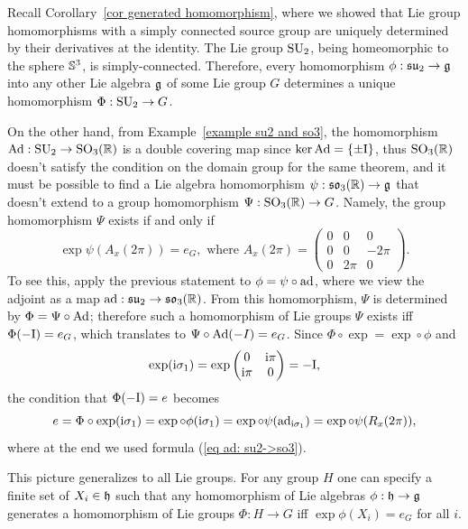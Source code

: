 \begin{example}
    Recall Corollary~\ref{cor generated homomorphism}, where we showed that Lie group homomorphisms with a simply connected source group are uniquely determined by their derivatives at the identity. The Lie group $\operatorname{SU}_2$, being homeomorphic to the sphere $\mathbb{S}^3$, is simply-connected. Therefore, every homomorphism $\phi:\mathfrak{su}_2\to\mathfrak{g}$ into any other Lie algebra $\mathfrak{g}$ of some Lie group $G$ determines a unique homomorphism $\Phi:\operatorname{SU}_2\to G$. 
    
    On the other hand, from Example~\ref{example su2 and so3}, the homomorphism $\mathrm{Ad}:\operatorname{SU}_2\to \operatorname{SO}_3(\mathbb{R})$ is a double covering map since $\ker\mathrm{Ad}=\{\pm \mathrm{I}\}$, thus $\operatorname{SO}_3(\mathbb{R})$ doesn't satisfy the condition on the domain group for the same theorem, and it must be possible to find a Lie algebra homomorphism $\psi:\mathfrak{so}_3(\mathbb{R})\to\mathfrak{g}$ that doesn't extend to a group homomorphism $\Psi:\operatorname{SO}_3(\mathbb{R})\to G$. Namely, the group homomorphism $\Psi$ exists if and only if 
    \[\exp \psi(A_{x}(2\pi))=e_G,\text{ where }A_x(2\pi)=
    \begin{pmatrix}
        0&0&0\\
        0&0&-2\pi\\
        0&2\pi &0
    \end{pmatrix}.
    \]
    To see this, apply the previous statement to $\phi=\psi\circ\mathrm{ad}$, where we view the adjoint as a map $\mathrm{ad}:\mathfrak{su}_2\to\mathfrak{so}_3(\mathbb{R})$. From this homomorphism, $\Psi$ is determined by $\Phi=\Psi\circ \mathrm{Ad}$; therefore such a homomorphism of Lie groups $\Psi$ exists iff $\Phi(-\mathrm{I})=e_G$, which translates to $\Psi\circ \mathrm{Ad}(-I)=e_G$. Since $\Phi\circ\exp=\exp\circ\phi$ and 
    \[\exp(\mathrm{i}\sigma_1)=\exp \begin{pmatrix}
        0&\mathrm{i}\pi\\\mathrm{i}\pi &0
    \end{pmatrix}=-\mathrm{I},\]
    the condition that $\Phi(-\mathrm{I})=e$ becomes
    \[e=\Phi\circ \exp (\mathrm{i}\sigma_1)=\exp\circ\phi (\mathrm{i}\sigma_1)=\exp\circ\psi( \mathrm{ad}_{\mathrm{i}\sigma_1})=\exp\circ\psi (R_x(2\pi)),\]
    where at the end we used formula (\ref{eq ad: su2->so3}).
    
    This picture generalizes to all Lie groups. For any group $H$ one can specify a finite set of $X_i\in\mathfrak{h}$ such that any homomorphism of Lie algebras $\phi:\mathfrak{h}\to\mathfrak{g}$ generates a homomorphism of Lie groups $\Phi:H\to G$ iff $\exp\phi(X_i)=e_G$ for all $i$.
\end{example}


